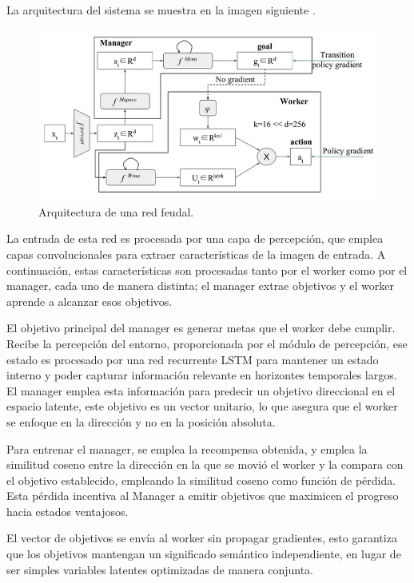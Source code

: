 \documentclass[letterpaper]{article} %
\begin{document}
La arquitectura del sistema se muestra en la imagen siguiente \cite{feudal_networks_2024}.

\begin{figure}[H]
    \centering
    \includegraphics[width=0.9\columnwidth]{feudal_arquitecture.png}
    \caption{Arquitectura de una red feudal.}
    \label{fig:arquitectura_feudal}
\end{figure}

La entrada de esta red es procesada por una capa de percepción, que emplea capas convolucionales
para extraer características de la imagen de entrada. A continuación, estas características son procesadas
tanto por el worker como por el manager, cada uno de manera distinta; el manager extrae objetivos y el worker
aprende a alcanzar esos objetivos.

El objetivo principal del manager es generar metas que el worker debe cumplir. Recibe la percepción
del entorno, proporcionada por el módulo de percepción, ese estado es procesado por una red recurrente LSTM
para mantener un estado interno y poder capturar información relevante en horizontes temporales largos.
El manager emplea esta información para predecir un objetivo direccional en el espacio latente, este objetivo
es un vector unitario, lo que asegura que el worker se enfoque en la dirección y no en la posición absoluta.

Para entrenar el manager, se emplea la recompensa obtenida, y emplea la similitud coseno entre la dirección en la que 
se movió el worker y la compara con el objetivo establecido, empleando la similitud coseno como función de pérdida.
Esta pérdida incentiva al Manager a emitir objetivos que maximicen el progreso hacia estados ventajosos.

El vector de objetivos se envía al worker sin propagar gradientes, esto garantiza que los objetivos 
mantengan un significado semántico independiente, en lugar de ser simples variables latentes optimizadas de manera conjunta.
\end{document}
